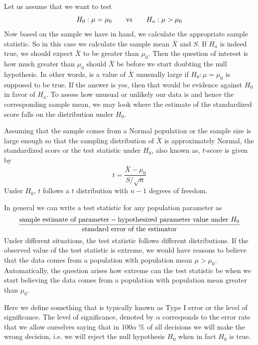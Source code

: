 \documentclass[12]{report}
\begin{document}
Let us assume that we want to test $$H_0: \mu = \mu_0 \qquad \hbox{vs} \qquad H_a: \mu > \mu_0$$
Now based on the sample we have in hand, we calculate the appropriate sample statistic. So in this case we calculate the sample mean $\bar{X}$ and $S$. If $H_a$ is indeed true, we should expect $\bar{X}$ to be greater than $\mu_0$. Then the question of interest is how much greater than $\mu_0$ should $\bar{X}$ be before we start doubting the null hypothesis. In other words, is a value of $\bar{X}$ unusually large if $H_0: \mu = \mu_0$ is supposed to be true. If the answer is yes, then that would be evidence against $H_0$ in favor of $H_a$. To assess how unusual or unlikely our data is and hence the corresponding sample mean, we may look where the estimate of the standardized score falls on the distribution under $H_0$. 

Assuming that the sample comes from a Normal population or the sample size is large enough so that the sampling distribution of $\bar{X}$ is approximately Normal, the standardized score or the test statistic under $H_0$, also known as, $t$-score is given by
$$t = \frac{\bar{X} - \mu_0}{S/\sqrt{n}}$$
Under $H_0$, $t$ follows a $t$ distribution with $n - 1$ degrees of freedom.

In general we can write a test statistic for any population parameter as 
$$\frac{\hbox{sample estimate of parameter} - \hbox{hypothesized parameter value under }H_0 }{\hbox{standard error of the estimator}}$$ 
Under different situations, the test statistic follows different distributions. If the observed value of the test statistic is extreme, we would have reasons to believe that the data comes from a population with population mean $\mu > \mu_0$. Automatically, the question arises how extreme can the test statistic be when we start believing the data comes from a population with population mean greater than $\mu_0$. 

 Here we define something that is typically known as Type I error or the level of significance. The level of significance, denoted by $\alpha$ corresponds to the error rate that we allow ourselves saying that in 100$\alpha$ \% of all decisions we will make the wrong decision, i.e. we will reject the null hypothesis $H_0$ when in fact $H_0$ is true. 
 
\end{document}
